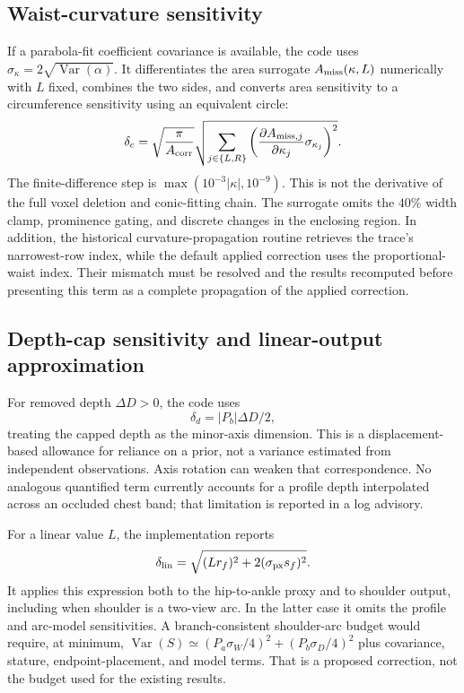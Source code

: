 \documentclass[11pt,a4paper]{article}
\numberwithin{equation}{section}
\begin{document}
\subsection{Waist-curvature sensitivity}
If a parabola-fit coefficient covariance is available, the code uses $\sigma_\kappa=2\sqrt{\operatorname{Var}(\alpha)}$. It differentiates the area surrogate $A_{\rm miss}(\kappa,L)$ numerically with $L$ fixed, combines the two sides, and converts area sensitivity to a circumference sensitivity using an equivalent circle:
\begin{equation}
\delta_c=\sqrt{\frac\pi{A_{\rm corr}}}
\sqrt{\sum_{j\in\{L,R\}}\left(\frac{\partial A_{{\rm miss},j}}{\partial\kappa_j}\sigma_{\kappa_j}\right)^2}.
\end{equation}
The finite-difference step is $\max(10^{-3}|\kappa|,10^{-9})$. This is not the derivative of the full voxel deletion and conic-fitting chain. The surrogate omits the $40\%$ width clamp, prominence gating, and discrete changes in the enclosing region. In addition, the historical curvature-propagation routine retrieves the trace's narrowest-row index, while the default applied correction uses the proportional-waist index. Their mismatch must be resolved and the results recomputed before presenting this term as a complete propagation of the applied correction.

\subsection{Depth-cap sensitivity and linear-output approximation}
For removed depth $\Delta D>0$, the code uses
\begin{equation}
\delta_d=|P_b|\Delta D/2,
\end{equation}
treating the capped depth as the minor-axis dimension. This is a displacement-based allowance for reliance on a prior, not a variance estimated from independent observations. Axis rotation can weaken that correspondence. No analogous quantified term currently accounts for a profile depth interpolated across an occluded chest band; that limitation is reported in a log advisory.

For a linear value $L$, the implementation reports
\begin{equation}
\delta_{\rm lin}=\sqrt{(Lr_f)^2+2(\sigma_{\rm px}s_f)^2}.
\end{equation}
It applies this expression both to the hip-to-ankle proxy and to shoulder output, including when shoulder is a two-view arc. In the latter case it omits the profile and arc-model sensitivities. A branch-consistent shoulder-arc budget would require, at minimum, $\operatorname{Var}(S)\simeq(P_a\sigma_W/4)^2+(P_b\sigma_D/4)^2$ plus covariance, stature, endpoint-placement, and model terms. That is a proposed correction, not the budget used for the existing results.
\end{document}
